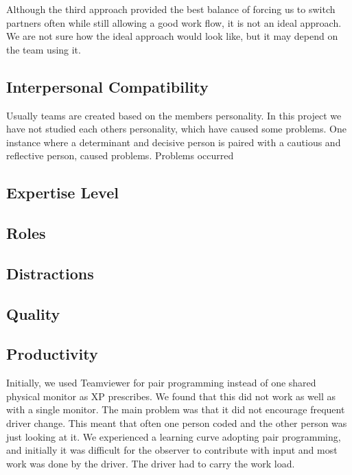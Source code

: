 Although the third approach provided the best balance of forcing us to switch partners often while still allowing a good work flow, it is not an ideal approach.
We are not sure how the ideal approach would look like, but it may depend on the team using it.


\subsection{Interpersonal Compatibility}
Usually teams are created based on the members personality. 
In this project we have not studied each others personality, which have caused some problems.
One instance where a determinant and decisive person is paired with a cautious and reflective person, caused problems.
Problems occurred 


\subsection{Expertise Level}



\subsection{Roles}



\subsection{Distractions}



\subsection{Quality}



\subsection{Productivity}







Initially, we used Teamviewer for pair programming instead of one shared physical monitor as XP prescribes.
We found that this did not work as well as with a single monitor. 
The main problem was that it did not encourage frequent driver change.
This meant that often one person coded and the other person was just looking at it.
We experienced a learning curve adopting pair programming, and initially it was difficult for the observer to contribute with input and most work was done by the driver. 
The driver had to carry the work load.


